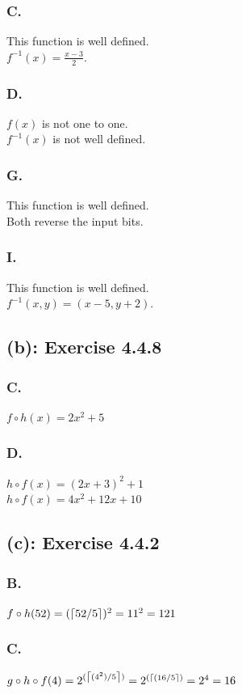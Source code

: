 \documentclass[titlepage]{article}\pagestyle{empty}
\DeclarePairedDelimiter\ceil{\lceil}{\rceil}
\begin{document}
\subsubsection*{C.} 
This function is well defined.\\
$f^{-1}(x)=\frac{x-3}{2}$.
\subsubsection*{D.} 
$f(x)$ is not one to one. \\
$f^{-1}(x)$ is not well defined.
\subsubsection*{G.} 
This function is well defined.\\
Both reverse the input bits. 
\subsubsection*{I.} 
This function is well defined.\\
$f^{-1}(x,y) = (x - 5, y+2)$.

\subsection*{(b): Exercise 4.4.8}
\subsubsection*{C.} $f \circ h(x) = 2x^2 + 5$
\subsubsection*{D.} 
$h \circ f(x) = (2x + 3)^2 + 1$\\
$h \circ f(x) = 4x^2 + 12x + 10$

\subsection*{(c): Exercise 4.4.2}
\subsubsection*{B.} 
$f \circ h(52) = (\ceil*{52/5})^2 =  11^2 = 121$
\subsubsection*{C.} 
$g \circ h \circ f(4) = 2^{(\ceil*{(4^2)/5})} = 2^{(\ceil*{(16/5})} = 2^4 = 16$
\end{document}
